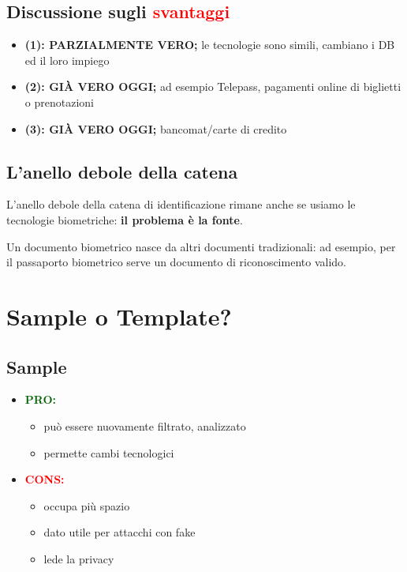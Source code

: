 \documentclass{report}
\begin{document}
\subsection{Discussione sugli \textcolor{red}{svantaggi}}
\begin{itemize}
    \item \textbf{(1): PARZIALMENTE VERO;} le tecnologie sono simili, cambiano i DB ed il loro impiego
    \item \textbf{(2): GIÀ VERO OGGI;} ad esempio Telepass, pagamenti online di biglietti o prenotazioni
    \item \textbf{(3): GIÀ VERO OGGI;} bancomat/carte di credito
\end{itemize}

\subsection{L'anello debole della catena}

L'anello debole della catena di identificazione rimane anche se usiamo le tecnologie biometriche: \textbf{il problema è la fonte}.

\noindent Un documento biometrico nasce da altri documenti tradizionali: ad esempio, per il passaporto biometrico serve un documento di riconoscimento valido.

\section{Sample o Template?}

\subsection{Sample}
\begin{itemize}
    \item \textbf{\textcolor{darkgreen}{PRO:}}
    \begin{itemize}
        \item può essere nuovamente filtrato, analizzato
        \item permette cambi tecnologici
    \end{itemize}
    \item \textbf{\textcolor{red}{CONS:}}
    \begin{itemize}
        \item occupa più spazio
        \item dato utile per attacchi con fake
        \item lede la privacy
    \end{itemize}
\end{itemize}
\end{document}

